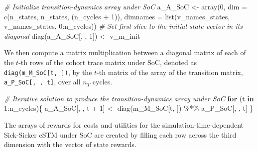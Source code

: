 \documentclass[
]{article}
\newenvironment{Shaded}{\begin{snugshade}}{\end{snugshade}}
\newcommand{\AttributeTok}[1]{\textcolor[rgb]{0.77,0.63,0.00}{#1}}
\newcommand{\CommentTok}[1]{\textcolor[rgb]{0.56,0.35,0.01}{\textit{#1}}}
\newcommand{\ControlFlowTok}[1]{\textcolor[rgb]{0.13,0.29,0.53}{\textbf{#1}}}
\newcommand{\DecValTok}[1]{\textcolor[rgb]{0.00,0.00,0.81}{#1}}
\newcommand{\FunctionTok}[1]{\textcolor[rgb]{0.00,0.00,0.00}{#1}}
\newcommand{\NormalTok}[1]{#1}
\newcommand{\OtherTok}[1]{\textcolor[rgb]{0.56,0.35,0.01}{#1}}
\newcommand{\SpecialCharTok}[1]{\textcolor[rgb]{0.00,0.00,0.00}{#1}}
\begin{document}
\begin{Shaded}
\begin{Highlighting}[]
\CommentTok{\# Initialize transition{-}dynamics array under SoC}
\NormalTok{a\_A\_SoC }\OtherTok{\textless{}{-}} \FunctionTok{array}\NormalTok{(}\DecValTok{0}\NormalTok{,}
             \AttributeTok{dim =} \FunctionTok{c}\NormalTok{(n\_states, n\_states, (n\_cycles }\SpecialCharTok{+} \DecValTok{1}\NormalTok{)),}
             \AttributeTok{dimnames =} \FunctionTok{list}\NormalTok{(v\_names\_states, v\_names\_states, }\DecValTok{0}\SpecialCharTok{:}\NormalTok{n\_cycles))}
\CommentTok{\# Set first slice to the initial state vector in its diagonal}
\FunctionTok{diag}\NormalTok{(a\_A\_SoC[, , }\DecValTok{1}\NormalTok{]) }\OtherTok{\textless{}{-}}\NormalTok{ v\_m\_init}
\end{Highlighting}
\end{Shaded}

We then compute a matrix multiplication between a diagonal matrix of each of the \(t\)-th rows of the cohort trace matrix under SoC, denoted as \texttt{diag(m\_M\_SoC{[}t,\ {]})}, by the \(t\)-th matrix of the array of the transition matrix, \texttt{a\_P\_SoC{[},\ ,\ t{]}}, over all \(n_T\) cycles.

\begin{Shaded}
\begin{Highlighting}[]
\CommentTok{\# Iterative solution to produce the transition{-}dynamics array under SoC}
\ControlFlowTok{for}\NormalTok{ (t }\ControlFlowTok{in} \DecValTok{1}\SpecialCharTok{:}\NormalTok{n\_cycles)\{}
\NormalTok{  a\_A\_SoC[, , t }\SpecialCharTok{+} \DecValTok{1}\NormalTok{] }\OtherTok{\textless{}{-}} \FunctionTok{diag}\NormalTok{(m\_M\_SoC[t, ]) }\SpecialCharTok{\%*\%}\NormalTok{ a\_P\_SoC[, , t]}
\NormalTok{\}}
\end{Highlighting}
\end{Shaded}

The arrays of rewards for costs and utilities for the simulation-time-dependent Sick-Sicker cSTM under SoC are created by filling each row across the third dimension with the vector of state rewards.
\end{document}
